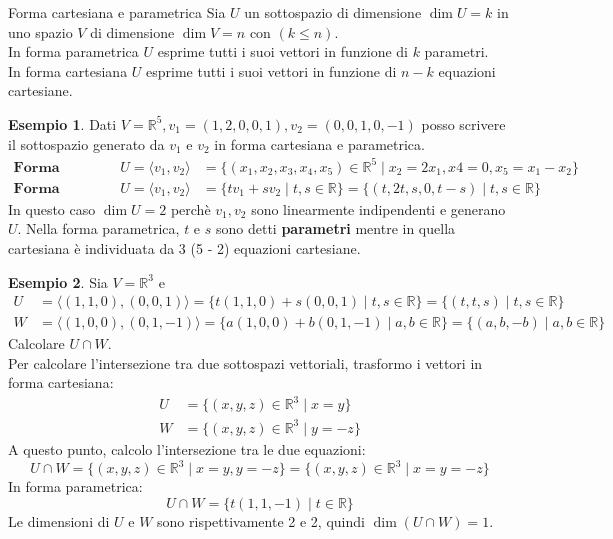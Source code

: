 \documentclass[a4paper]{article}
\theoremstyle{definition}
\newtheorem*{es}{Esempio}
\begin{document}
\begin{deff}{Forma cartesiana e parametrica}{}
	Sia $U$ un sottospazio di dimensione $\dim U = k$ in uno spazio $V$ di dimensione $\dim V = n$ con $(k \leq n)$. \\
	In forma parametrica $U$ esprime tutti i suoi vettori in funzione di $k$ parametri. \\
	In forma cartesiana $U$ esprime tutti i suoi vettori in funzione di $n - k$ equazioni cartesiane.
\end{deff}
\begin{es}
	Dati $V = \mathbb{R}^5, v_1 = (1, 2, 0, 0, 1), v_2 = (0, 0, 1, 0, -1)$ posso scrivere il sottospazio generato da $v_1$ e $v_2$ in forma cartesiana e parametrica.
	\begin{align*}
		\textbf{Forma cartesiana}  &  & U = \langle v_1, v_2 \rangle & = \{(x_1, x_2, x_3, x_4, x_5) \in \mathbb{R}^5 \mid x_2 = 2x_1, x4 = 0, x_5 = x_1 - x_2\}      \\
		\textbf{Forma parametrica} &  & U = \langle v_1, v_2 \rangle & = \{tv_1 + sv_2 \mid t, s \in \mathbb{R}\} = \{(t, 2t, s, 0, t - s) \mid t, s \in \mathbb{R}\}
	\end{align*}
	In questo caso $\dim U = 2$ perchè $v_1, v_2$ sono linearmente indipendenti e generano $U$.
	Nella forma parametrica, $t$ e $s$ sono detti \textbf{parametri} mentre in quella cartesiana è individuata da 3 (5 - 2) equazioni cartesiane.
\end{es}
\begin{es}
	Sia $V = \mathbb{R}^3$ e
	\begin{align*}
		U & = \langle (1, 1, 0), (0, 0, 1) \rangle = \{t(1, 1, 0) + s(0, 0, 1) \mid t, s \in \mathbb{R}\} = \{(t, t, s) \mid t, s \in \mathbb{R}\}    \\
		W & = \langle (1, 0, 0), (0, 1, -1) \rangle = \{a(1, 0, 0) + b(0, 1, -1) \mid a, b \in \mathbb{R}\} = \{(a, b, -b) \mid a, b \in \mathbb{R}\}
	\end{align*}
	Calcolare $U \cap W$.
	\\
	Per calcolare l'intersezione tra due sottospazi vettoriali, trasformo i vettori in forma cartesiana:
	\begin{align*}
		U & = \{(x, y, z) \in \mathbb{R}^3 \mid x = y\}  \\
		W & = \{(x, y, z) \in \mathbb{R}^3 \mid y = -z\}
	\end{align*}
	A questo punto, calcolo l'intersezione tra le due equazioni:
	\begin{equation*}
		U \cap W = \{(x, y, z) \in \mathbb{R}^3 \mid x = y, y = -z\} = \{(x, y, z) \in \mathbb{R}^3 \mid x = y = -z\}
	\end{equation*}
	In forma parametrica:
	\begin{equation*}
		U \cap W = \{t(1, 1, -1) \mid t \in \mathbb{R}\}
	\end{equation*}
	Le dimensioni di $U$ e $W$ sono rispettivamente 2 e 2, quindi $\dim(U \cap W) = 1$.
\end{es}
\end{document}

